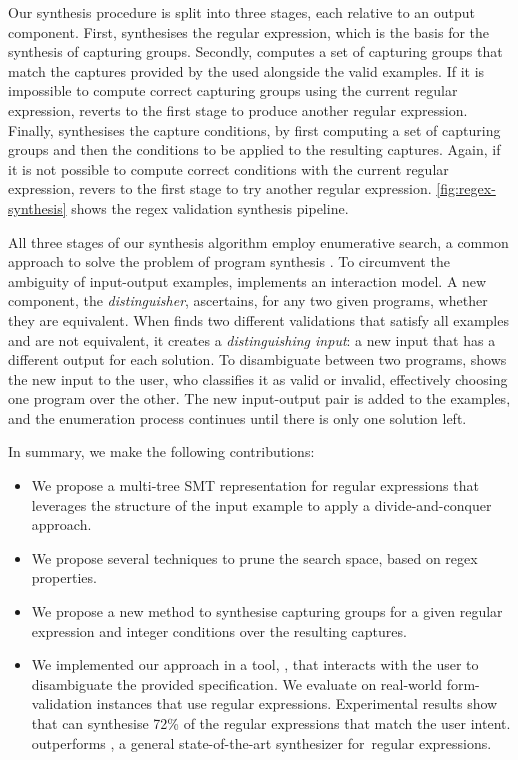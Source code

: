 Our synthesis procedure is split into three stages, each relative to an output component. %
First, \Forest synthesises the regular expression, which is the basis for the synthesis of capturing groups.
Secondly, \Forest computes a set of capturing groups that match the captures provided by the used alongside the valid examples. If it is impossible to compute correct capturing groups using the current regular expression, \Forest reverts to the first stage to produce another regular expression.
Finally, \Forest synthesises the capture conditions, by first computing a set of capturing groups and then the conditions to be applied to the resulting captures. Again, if it is not possible to compute correct conditions with the current regular expression, \Forest revers to the first stage to try another regular expression.
\autoref{fig:regex-synthesis} shows the regex validation synthesis pipeline.

All three stages of our synthesis algorithm employ enumerative search, a common approach to solve the problem of program synthesis \cite{DBLP:conf/pldi/FengMBD18,DBLP:conf/pldi/FengMGDC17,AlphaRegex16,Orvalho19,DBLP:conf/cav/ReynoldsBNBT19}.
%
To circumvent the ambiguity of input-output examples,
\Forest{} implements an interaction model.
A new component, the \textit{distinguisher}, ascertains, for any two given programs, whether they are equivalent.
When \Forest finds two different validations that satisfy all examples and are not equivalent, it creates a \textit{distinguishing input}: a new input that has a different output for each solution.
%
To disambiguate between two programs,
\Forest shows the new input to the user, who classifies it as valid or invalid, effectively choosing one program over the other.
%
The new input-output pair is added to the examples, and the enumeration process continues until there is only one solution left.


In summary, we make the following contributions:

\begin{itemize}
    \item We propose a multi-tree SMT representation for regular expressions that leverages the structure of the input example to apply a divide-and-conquer approach.
    
    \item We propose several techniques to prune the search space, based on regex properties.
    
    \item We propose a new method to synthesise capturing groups for a given regular expression and integer conditions over the resulting captures.
    
    \item We implemented our approach in a tool, \Forest{}, that interacts with the user to disambiguate the provided specification. We evaluate \Forest{} on real-world form-validation instances that use regular expressions. Experimental results show that \Forest can synthesise 72\% of the regular expressions that match the user intent.  \Forest{} outperforms \Regel, a general state-of-the-art synthesizer for~regular expressions.
\end{itemize}

